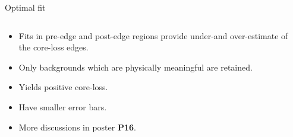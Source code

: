 \documentclass[aspectratio=169]{beamer}
\begin{document}
\begin{frame}{Optimal fit}

\begin{columns}[t]
	\begin{column}{.6\textwidth}
		\begin{itemize}
			\item Fits in pre-edge and post-edge regions provide under-and over-estimate of the core-loss edges.
			\item Only backgrounds which are physically meaningful are retained.
			\item Yields positive core-loss.
			\item Have smaller error bars.
			\item More discussions in poster \textbf{\LARGE{\alert{P16}}}.
		\end{itemize}
	\end{column}

	\begin{column}{.4\textwidth}
		\vspace{0.1cm}
	\end{column}
\end{columns}

\end{frame}



%
\end{document}
